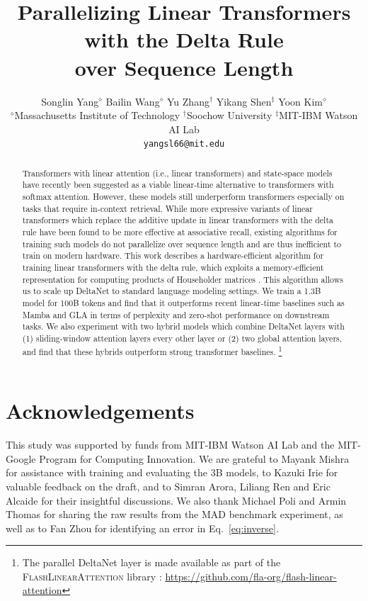 \documentclass{article}
\title{Parallelizing  Linear Transformers with the Delta  Rule  \\ over Sequence Length}
\author{
{
Songlin Yang$^{\diamond}$ \quad Bailin Wang$^{\diamond}$ \quad Yu Zhang$^\dagger$ \quad Yikang Shen$^{\ddag}$ \quad Yoon Kim$^{\diamond}$ \vspace{1mm}
}
\\ \vspace{2mm}
$^{\diamond}$Massachusetts Institute of Technology \quad  $^\dagger$Soochow University  \quad $^{\ddag}$MIT-IBM Watson AI Lab   \\  \vspace{2mm}
\texttt{yangsl66@mit.edu}
 \vspace{-4mm}
}
\newcommand\blfootnote[1]{%
  \begingroup
  \renewcommand\thefootnote{}\footnote{#1}%
  \addtocounter{footnote}{-1}%
  \endgroup
}
\begin{document}
\maketitle
\begin{abstract}
Transformers with linear attention (i.e., linear transformers) and  state-space models have recently been suggested as a viable linear-time alternative to  transformers with softmax attention. However, these models still  underperform transformers especially on tasks that require in-context retrieval. While more expressive variants of linear transformers which replace the additive  update in linear transformers with the delta rule \cite[DeltaNet;][]{schlag_linear_2021} have been found to be more effective at associative recall, existing algorithms for training such  models do not parallelize over sequence length and are thus inefficient to train on modern hardware. This work describes a hardware-efficient algorithm for training linear transformers with the delta rule, which exploits a memory-efficient representation for computing products of Householder matrices \cite{bischof_wy_1985}. 
This algorithm allows us to scale up DeltaNet to standard language modeling settings. We train a 1.3B model for 100B tokens and find that it outperforms recent linear-time baselines such as Mamba \cite{gu_mamba_2023} and GLA \cite{yang_gated_2023} in terms of perplexity and zero-shot performance on downstream tasks. We also experiment with two hybrid models which combine DeltaNet layers with (1) sliding-window attention layers every other layer or (2) two global attention layers, and find that these hybrids  outperform strong  transformer baselines.\blfootnote{\noindent \hspace{-6mm} The parallel DeltaNet layer is made available as part of the \textsc{FlashLinearAttention} library \cite{yang_gated_2023,yang_fla_2024}: \url{https://github.com/fla-org/flash-linear-attention}} 

\end{abstract}






\section*{Acknowledgements}
This study was supported by funds from  MIT-IBM Watson AI Lab and the MIT-Google Program for Computing Innovation. We are grateful to Mayank Mishra for assistance with training and evaluating the 3B models, to Kazuki Irie for valuable feedback on the draft, and to Simran Arora, Liliang Ren and Eric Alcaide for their insightful discussions. We also thank Michael Poli and Armin Thomas for sharing the raw results from the MAD benchmark experiment, as well as to Fan Zhou for identifying an error in Eq.~\ref{eq:inverse}.





\appendix

\end{document}
